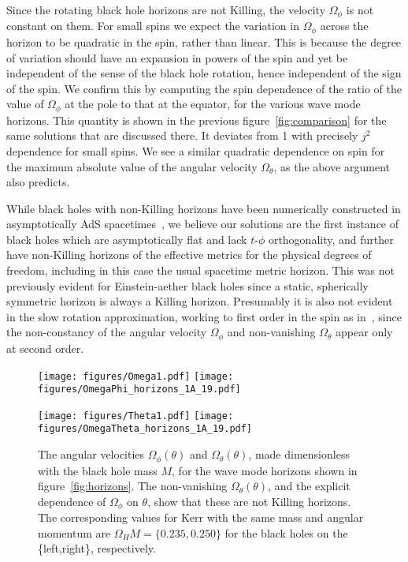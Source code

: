 \documentclass[12pt]{article}
\numberwithin{equation}{section}
\begin{document}
Since the rotating black hole horizons are not Killing, the velocity $\Omega_\phi$ is not constant on them.
For small spins we expect the variation in $\Omega_\phi$ across the horizon to be quadratic in the spin, rather than linear. This is because the degree of variation should have an expansion in powers of the spin and yet be independent of the sense of the black hole 
rotation, hence independent of the sign of the spin. We confirm this by computing the spin dependence of
the ratio of the value of $\Omega_\phi$ at the pole 
to that at the equator, for the various wave mode horizons. This quantity is shown in the previous figure~\ref{fig:comparison} for the same solutions that are discussed there. It deviates from 1 with precisely $j^2$ dependence for small spins. We see a similar quadratic dependence on spin for the maximum absolute value of the angular velocity $\Omega_\theta$, as the above argument also predicts. 





While black holes with non-Killing horizons have been numerically constructed in asymptotically AdS spacetimes~\cite{Figueras:2012rb,Fischetti:2012vt,Sonner:2017jcf}, we believe our solutions are the first instance of black holes which are asymptotically flat and lack $t$-$\phi$ orthogonality, and further have non-Killing horizons of the effective metrics for the physical degrees of freedom,
including in this case the usual spacetime metric horizon.
This was not previously evident 
for Einstein-aether black holes since 
a static, spherically symmetric horizon is always
a Killing horizon. Presumably it
is also not evident in the slow rotation approximation,
working to first order in the spin as in~\cite{Barausse:2015frm}, since the non-constancy of the angular velocity $\Omega_\phi$ and non-vanishing $\Omega_\theta$ appear only at second order.



\begin{figure}
\centerline{ 
  \texttt{[image: figures/Omega1.pdf]}
  \hspace{0.1cm}
  \texttt{[image: figures/OmegaPhi\_horizons\_1A\_19.pdf]}
  }
  \centerline{ 
  \texttt{[image: figures/Theta1.pdf]}
  \hspace{0.1cm}
  \texttt{[image: figures/OmegaTheta\_horizons\_1A\_19.pdf]}
  }
  \caption{\label{fig:omega} 
  The angular velocities $\Omega_{\phi}(\theta)$ and $\Omega_{\theta}(\theta)$, made dimensionless with the black hole mass $M$, for the wave mode horizons shown in  figure~\ref{fig:horizons}. The non-vanishing $\Omega_{\theta}(\theta)$, and the explicit dependence of $\Omega_{\phi}$ on $\theta$, show that these are not Killing horizons. The corresponding values for Kerr with the same 
  mass and angular momentum are 
  $\Omega_H M =\{0.235, 0.250\}$ for the black holes on the \{left,right\}, respectively.
  }
\end{figure}
\end{document}
